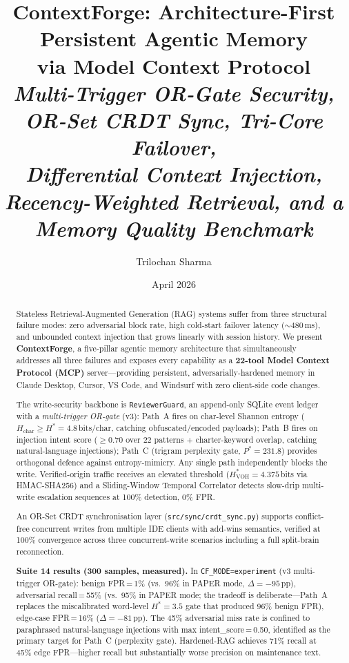 \documentclass[11pt,twocolumn]{article}
\title{%
  \textbf{ContextForge: Architecture-First Persistent Agentic Memory\\
    via Model Context Protocol}\\[0.35em]
  \large\textit{Multi-Trigger OR-Gate Security, OR-Set CRDT Sync,
    Tri-Core Failover,\\
    Differential Context Injection, Recency-Weighted Retrieval,
    and a Memory Quality Benchmark}%
}
\author[1]{Trilochan Sharma}
\affil[1]{Independent Researcher \quad \texttt{parnishklpo@gmail.com}}
\date{April 2026}
\begin{document}
\maketitle

\begin{abstract}
Stateless Retrieval-Augmented Generation (RAG) systems suffer from three
structural failure modes: zero adversarial block rate, high cold-start
failover latency (${\sim}480$\,ms), and unbounded context injection that
grows linearly with session history.
We present \textbf{ContextForge}, a five-pillar agentic memory architecture
that simultaneously addresses all three failures and exposes every capability
as a \textbf{22-tool Model Context Protocol (MCP)} server---providing
persistent, adversarially-hardened memory in Claude Desktop, Cursor,
VS Code, and Windsurf with zero client-side code changes.

The write-security backbone is \texttt{ReviewerGuard}, an append-only SQLite
event ledger with a \emph{multi-trigger OR-gate} (v3): Path~A fires on
char-level Shannon entropy ($H_{\mathrm{char}} \geq H^{*} = 4.8$\,bits/char,
catching obfuscated/encoded payloads); Path~B fires on injection intent score
($\geq 0.70$ over 22 patterns + charter-keyword overlap, catching natural-language
injections); Path~C (trigram perplexity gate, $P^{*}=231.8$) provides orthogonal
defence against entropy-mimicry.  Any single path independently blocks the write.
Verified-origin traffic receives an elevated threshold ($H^{*}_{\mathrm{VOH}} =
4.375$\,bits via HMAC-SHA256) and a Sliding-Window Temporal Correlator detects
slow-drip multi-write escalation sequences at 100\% detection, 0\% FPR.

An OR-Set CRDT synchronisation layer (\texttt{src/sync/crdt\_sync.py})
supports conflict-free concurrent writes from multiple IDE clients with
add-wins semantics, verified at 100\% convergence across three concurrent-write
scenarios including a full split-brain reconnection.

\textbf{Suite 14 results (300 samples, measured).}
In \texttt{CF\_MODE=experiment} (v3 multi-trigger OR-gate):
benign FPR\,=\,1\% (vs.\ 96\% in PAPER mode, $\Delta=-95$\,pp),
adversarial recall\,=\,55\% (vs.\ 95\% in PAPER mode; the tradeoff is
deliberate---Path~A replaces the miscalibrated word-level $H^{*}\!=\!3.5$ gate
that produced 96\% benign FPR), edge-case FPR\,=\,16\% ($\Delta=-81$\,pp).
The 45\% adversarial miss rate is confined to paraphrased natural-language
injections with max intent\_score\,=\,0.50, identified as the primary target
for Path~C (perplexity gate).  Hardened-RAG achieves 71\% recall at 45\%
edge FPR---higher recall but substantially worse precision on maintenance text.


\end{abstract}
\end{document}
